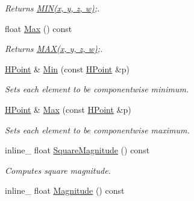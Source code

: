 \begin{DoxyCompactItemize}
\begin{DoxyCompactList}\small\item\em Returns \hyperlink{IceTypes_8h_a3acffbd305ee72dcd4593c0d8af64a4f}{M\+I\+N(x, y, z, w)};. \end{DoxyCompactList}\item 
float \hyperlink{classOpcode_1_1HPoint_aad26409d690d56b8e715fb37c1be838e}{Max} () const \hypertarget{classOpcode_1_1HPoint_aad26409d690d56b8e715fb37c1be838e}{}\label{classOpcode_1_1HPoint_aad26409d690d56b8e715fb37c1be838e}

\begin{DoxyCompactList}\small\item\em Returns \hyperlink{IceTypes_8h_afa99ec4acc4ecb2dc3c2d05da15d0e3f}{M\+A\+X(x, y, z, w)};. \end{DoxyCompactList}\item 
\hyperlink{classOpcode_1_1HPoint}{H\+Point} \& \hyperlink{classOpcode_1_1HPoint_aa78c7bc7ded74497ee7ce232eea87511}{Min} (const \hyperlink{classOpcode_1_1HPoint}{H\+Point} \&p)\hypertarget{classOpcode_1_1HPoint_aa78c7bc7ded74497ee7ce232eea87511}{}\label{classOpcode_1_1HPoint_aa78c7bc7ded74497ee7ce232eea87511}

\begin{DoxyCompactList}\small\item\em Sets each element to be componentwise minimum. \end{DoxyCompactList}\item 
\hyperlink{classOpcode_1_1HPoint}{H\+Point} \& \hyperlink{classOpcode_1_1HPoint_a9490eeae0a6766fb01675d805d2c5b72}{Max} (const \hyperlink{classOpcode_1_1HPoint}{H\+Point} \&p)\hypertarget{classOpcode_1_1HPoint_a9490eeae0a6766fb01675d805d2c5b72}{}\label{classOpcode_1_1HPoint_a9490eeae0a6766fb01675d805d2c5b72}

\begin{DoxyCompactList}\small\item\em Sets each element to be componentwise maximum. \end{DoxyCompactList}\item 
inline\+\_\+ float \hyperlink{classOpcode_1_1HPoint_a7787ef76009f498812d55b6810f7801f}{Square\+Magnitude} () const \hypertarget{classOpcode_1_1HPoint_a7787ef76009f498812d55b6810f7801f}{}\label{classOpcode_1_1HPoint_a7787ef76009f498812d55b6810f7801f}

\begin{DoxyCompactList}\small\item\em Computes square magnitude. \end{DoxyCompactList}\item 
inline\+\_\+ float \hyperlink{classOpcode_1_1HPoint_ab678d86554fba768f10cf598562a60d1}{Magnitude} () const \hypertarget{classOpcode_1_1HPoint_ab678d86554fba768f10cf598562a60d1}{}\label{classOpcode_1_1HPoint_ab678d86554fba768f10cf598562a60d1}


\end{DoxyCompactItemize}
